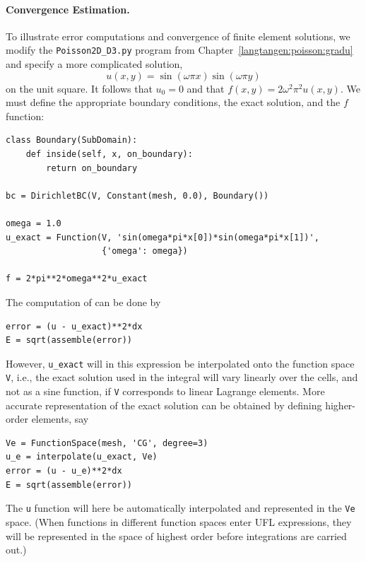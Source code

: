 \paragraph{Convergence Estimation.}
To illustrate error computations and convergence of finite element
solutions, we modify the {\fontsize{12pt}{12pt}\verb!Poisson2D_D3.py!} program from
Chapter~\ref{langtangen:poisson:gradu} and specify a more complicated solution,
\[ u(x,y) = \sin(\omega\pi x)\sin(\omega\pi y)\]
on the unit square. It follows that $u_0=0$ and that $f(x,y)=2\omega^2\pi^2
u(x,y)$. We must define the
appropriate boundary conditions, the exact solution, and the $f$ function:
\begin{Verbatim}[fontsize=\fontsize{10pt}{10pt},tabsize=8,baselinestretch=1.05,
fontfamily=tt,xleftmargin=7mm]
class Boundary(SubDomain):
    def inside(self, x, on_boundary):
        return on_boundary

bc = DirichletBC(V, Constant(mesh, 0.0), Boundary())

omega = 1.0
u_exact = Function(V, 'sin(omega*pi*x[0])*sin(omega*pi*x[1])',
                   {'omega': omega})

f = 2*pi**2*omega**2*u_exact
\end{Verbatim}
\noindent

The computation of  can be done by
\begin{Verbatim}[fontsize=\fontsize{10pt}{10pt},tabsize=8,baselinestretch=1.05,
fontfamily=tt,xleftmargin=7mm]
error = (u - u_exact)**2*dx
E = sqrt(assemble(error))
\end{Verbatim}
\noindent
However, {\fontsize{12pt}{12pt}\verb!u_exact!} will in this expression be interpolated onto
the function space {\fontsize{12pt}{12pt}\texttt{V}}, i.e., the exact solution used in
the integral will vary linearly over
the cells, and not as a sine function,
if {\fontsize{12pt}{12pt}\texttt{V}} corresponds to linear Lagrange elements.
More accurate representation of the exact solution can be obtained
by defining higher-order elements, say
\begin{Verbatim}[fontsize=\fontsize{10pt}{10pt},tabsize=8,baselinestretch=1.05,
fontfamily=tt,xleftmargin=7mm]
Ve = FunctionSpace(mesh, 'CG', degree=3)
u_e = interpolate(u_exact, Ve)
error = (u - u_e)**2*dx
E = sqrt(assemble(error))
\end{Verbatim}
\noindent
{}
The {\fontsize{12pt}{12pt}\texttt{u}} function will here be automatically interpolated and
represented in the
{\fontsize{12pt}{12pt}\texttt{Ve}} space. (When functions in different function spaces enter
UFL expressions, they will be represented in the space of highest
order before integrations are carried out.)

